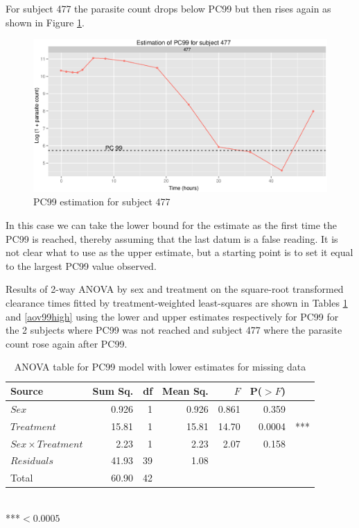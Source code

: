 For subject 477 the parasite count drops below PC99 but then rises again as shown in Figure \ref{477}.
\begin{figure}[h]
\includegraphics[width=150mm]{477.eps} 
\caption{PC99 estimation for subject 477}
\label{477}
\end{figure}
In this case we can take the lower bound for the estimate as the first time the PC99 is reached, thereby assuming that the last datum is a false reading. It is not clear what to use as the upper estimate, but a starting point is to set it equal to the largest PC99 value observed.

Results of 2-way ANOVA by sex and treatment on the square-root transformed clearance times fitted by treatment-weighted least-squares are shown in Tables \ref{aov99low} and \ref{aov99high} using the lower and upper estimates respectively for PC99 for the 2 subjects where PC99 was not reached and subject 477 where the parasite count rose again after PC99.
\begin{table}[h]
\centering
\caption{ANOVA table for PC99 model with lower estimates for missing data}\label{aov99low}
\begin{tabular}{l|rrrrrl}
Source&Sum Sq.&df&Mean Sq.&$F$&P($>F$)\\
\hline
$Sex$				& 0.926 & 1 & 0.926 & 0.861 & 0.359 & \\
$Treatment$			& 15.81   & 1 & 15.81   & 14.70   & 0.0004 &*** \\
$Sex\times Treatment$	& 2.23   & 1 & 2.23   & 2.07   & 0.158 & \\
$Residuals$			& 41.93 & 39 & 1.08 &&&\\
\hline
Total&60.90&42&&&
\end{tabular}\\
***$<0.0005$
\end{table}

